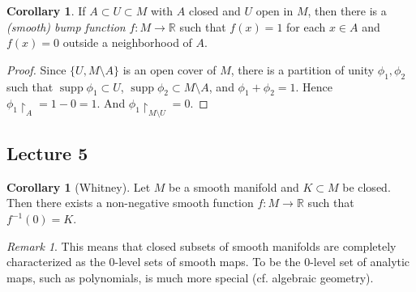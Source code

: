 \documentclass[10pt,letterpaper,cm]{nupset}
\theoremstyle{definition}
\theoremstyle{theorem}
\newtheorem{corollary}[definition]{Corollary}
\theoremstyle{remark}
\newtheorem{remark}[definition]{Remark}
\newcommand{\R}{\mathbb R}
\newcommand{\1}{\mathbf{1}}
\newcommand{\0}{\vec 0}
\DeclareMathOperator{\supp}{supp}
\begin{document}
\begin{corollary}
If $A \subset U \subset M$ with $A$ closed and $U$ open in $M$, then there is a  \textit{(smooth) bump function} $f: M \to \R$ such that $f(x) = 1$ for each $x\in A$ and $f(x) =0$ outside a neighborhood of $A$.
\end{corollary}

\begin{proof}
Since $\{U, M \setminus A\}$ is an open cover of $M$, there is a partition of unity $\phi_1, \phi_2$ such that $\supp \phi_1 \subset U$, $\supp \phi_2 \subset M \setminus A$, and $\phi_1 + \phi_2 = 1$. Hence $\phi_1 \restriction_A = 1 - 0 = 1$. And $\phi_1 \restriction_{M\setminus U} = 0$.
\end{proof}

\subsection{Lecture 5}

\begin{corollary}[Whitney]
Let $M$ be a smooth manifold and $K \subset M$ be closed. Then there exists a non-negative smooth function $f: M \to \R$ such that $f^{-1}(0) =K$.
\end{corollary}

\begin{remark}
This means that closed subsets of smooth manifolds are completely characterized as the $0$-level sets of smooth maps. To be the $0$-level set of analytic maps, such as polynomials, is much more special (cf. algebraic geometry).
\end{remark}
\end{document}
